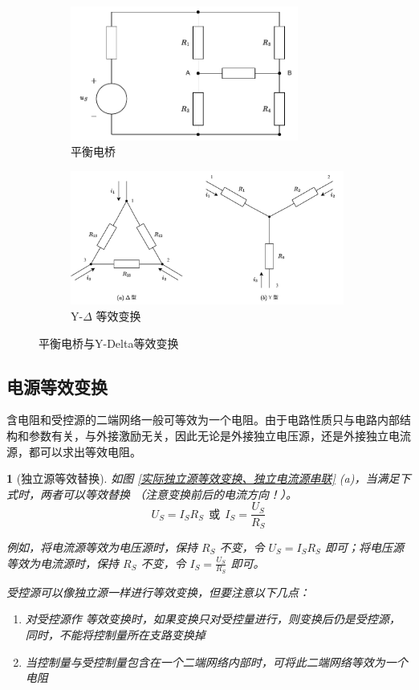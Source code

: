 \documentclass[UTF8]{report}
\theoremstyle{MyLineTheoremStyle} %
\theoremstyle{MyBlockTheoremStyle} %
\theoremstyle{MySubsubsectionStyle} %
\newtheorem{definition}{}
\begin{document}
\begin{figure}[H]\centering
\begin{subfigure}[t]{0.46\textwidth}\centering
    \includegraphics[height=125pt]{assets/1,2/平衡电桥.drawio.pdf}
    \caption{ 平衡电桥 }
\end{subfigure}\begin{subfigure}[t]{0.54\textwidth}\centering
    \includegraphics[height=125pt]{assets/1,2/YDelta等效变换.drawio.pdf}
    \caption{ Y-$\Delta$ 等效变换 }
\end{subfigure}
\caption{ 平衡电桥与Y-Delta等效变换 }\label{平衡电桥与Y-Delta等效变换}
\end{figure}

\subsection{电源等效变换}

含电阻和受控源的二端网络一般可等效为一个电阻。由于电路性质只与电路内部结构和参数有关，与外接激励无关，因此无论是外接独立电压源，还是外接独立电流源，都可以求出等效电阻。


\begin{definition}[独立源等效替换]
如图 \ref{实际独立源等效变换、独立电流源串联} (a)，当满足下式时，两者可以等效替换 {\color{red}（注意变换前后的电流方向！）}。
\begin{equation}
U_S = I_SR_S\ \  \text{或}\ \  I_S = \frac{U_S}{R_S}
\end{equation}

例如，将电流源等效为电压源时，保持 $R_S$ 不变，令 $U_S = I_S R_S$ 即可；将电压源等效为电流源时，保持 $R_S$ 不变，令 $I_S = \frac{U_S}{R_S}$ 即可。

受控源可以像独立源一样进行等效变换，但要注意以下几点：
\begin{enumerate}
\item 对受控源作
等效变换时，如果变换只对受控量进行，则变换后仍是受控源，同时，不能将控制量所在支路变换掉
\item 当控制量与受控制量包含在一个二端网络内部时，可将此二端网络等效为一个电阻
\end{enumerate}
\end{definition}
\end{document}
